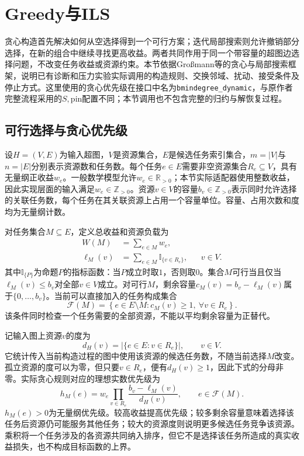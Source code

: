 \section{Greedy与ILS}
\label{sec:03_03}

贪心构造首先解决如何从空选择得到一个可行方案；迭代局部搜索则允许撤销部分选择，在新的组合中继续寻找更高收益。两者共同作用于同一个带容量的超图边选择问题，不改变任务收益或资源约束。本节依据Großmann等的贪心与局部搜索框架\cite{GrossmannJRS2026}，说明已有诊断和压力实验实际调用的构造规则、交换邻域、扰动、接受条件及停止方式。这里使用的贪心优先级在接口中名为\texttt{bmindegree\_dynamic}，与原作者完整流程采用的$S,\mathrm{pin}$配置不同；本节调用也不包含完整的归约与解恢复过程。

\subsection{可行选择与贪心优先级}

设$H=(V,E)$为输入超图，$V$是资源集合，$E$是候选任务索引集合，$m=|V|$与$n=|E|$分别表示资源数和任务数。每个任务$e\in E$需要非空资源集合$R_e\subseteq V$，具有无量纲正收益$w_e$。一般数学模型允许$w_e\in\mathbb{R}_{>0}$；本节实际适配器使用整数收益，因此实现层面的输入满足$w_e\in\mathbb{Z}_{>0}$。资源$v\in V$的容量$b_v\in\mathbb{Z}_{>0}$表示同时允许选择的关联任务数，每个任务在其关联资源上占用一个容量单位。容量、占用次数和度均为无量纲计数。

对任务集合$M\subseteq E$，定义总收益和资源负载为
\begin{align}
 W(M)&=\sum_{e\in M}w_e,
 \label{s0303:weight}\\
 \ell_M(v)&=\sum_{e\in M}\mathbb{I}_{\{v\in R_e\}},
 &&v\in V.
 \label{s0303:load}
\end{align}
其中$\mathbb{I}_{\{P\}}$为命题$P$的指标函数：当$P$成立时取$1$，否则取$0$。集合$M$可行当且仅当$\ell_M(v)\leq b_v$对全部$v\in V$成立。对可行$M$，剩余容量$c_M(v)=b_v-\ell_M(v)$属于$\{0,\ldots,b_v\}$。当前可以直接加入的任务构成集合
\begin{equation}
 \mathcal{F}(M)=\left\{e\in E\setminus M:
 c_M(v)\geq1,\ \forall v\in R_e\right\}.
 \label{s0303:free_edges}
\end{equation}
该条件同时检查一个任务需要的全部资源，不能以平均剩余容量为正替代。

记输入图上资源$v$的度为
\begin{equation}
 d_H(v)=\left|\{e\in E:v\in R_e\}\right|,
 \qquad v\in V.
 \label{s0303:degree}
\end{equation}
它统计传入当前构造过程的图中使用该资源的候选任务数，不随当前选择$M$改变。孤立资源的度可以为零，但只要$v\in R_e$，便有$d_H(v)\geq1$，因此下式的分母非零。实际贪心规则对应的理想实数优先级为
\begin{equation}
 h_M(e)=w_e\prod_{v\in R_e}
 \frac{b_v-\ell_M(v)}{d_H(v)},
 \qquad e\in\mathcal{F}(M).
 \label{s0303:priority}
\end{equation}
$h_M(e)>0$为无量纲优先级。较高收益提高优先级；较多剩余容量意味着选择该任务后资源仍可能服务其他任务；较大的资源度则说明更多候选任务竞争该资源。乘积将一个任务涉及的各资源共同纳入排序，但它不是选择该任务所造成的真实收益损失，也不构成目标函数的上界。

